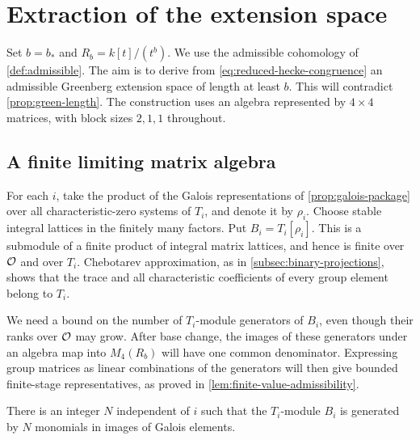 \section{Extraction of the extension space}
\label{sec:extensions}

Set $b=b_*$ and $R_b=k[t]/(t^b)$.  We use the admissible cohomology
of \cref{def:admissible}.  The aim is to derive from
\cref{eq:reduced-hecke-congruence} an admissible Greenberg extension space
of length at least $b$.  This will contradict \cref{prop:green-length}.
The construction uses an algebra represented by $4\times4$ matrices, with block sizes
$2,1,1$ throughout.

\subsection{A finite limiting matrix algebra}

For each $i$, take the product of the Galois representations of
\cref{prop:galois-package} over all characteristic-zero systems of
$T_i$, and denote it by $\rho_i$.  Choose stable integral lattices in
the finitely many factors.  Put $B_i=T_i[\rho_i]$.  This is a
submodule of a finite product of integral matrix lattices, and hence
is finite over $\mathcal O$ and over $T_i$.  Chebotarev approximation, as in
\cref{subsec:binary-projections}, shows that the trace and all
characteristic coefficients of every group element belong to $T_i$.

We need a bound on the number of $T_i$-module generators of $B_i$,
even though their ranks over $\mathcal O$ may grow.  After base change, the
images of these generators under an algebra map into $M_4(R_b)$
will have one common denominator.  Expressing group matrices as
linear combinations of the generators will then give bounded
finite-stage representatives, as proved in
\cref{lem:finite-value-admissibility}.

\begin{lemma}
\label{lem:bounded-algebra-generators}
There is an integer $N$ independent of $i$ such that the $T_i$-module
$B_i$ is generated by $N$ monomials in images of Galois elements.
\end{lemma}

